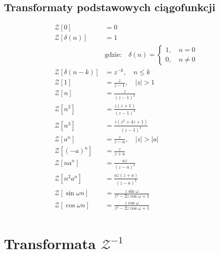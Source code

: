 \documentclass[a4paper,12pt]{article}
\begin{document}
\begin{multicols}{2}
\subsection*{Transformaty podstawowych ciągofunkcji}
    \begingroup
    \allowdisplaybreaks
    \begin{align*}
        \mathcal{Z}\left[0\right] &= 0 \\
        \mathcal{Z}\left[\delta\left(n\right)\right] &= 1\\
            &\text{gdzie:} \quad \delta\left(n\right) = \left\{
                \begin{array}{l}
                    1, \quad n = 0 \\
                    0, \quad n \not = 0
                \end{array}
            \right. \\
        \mathcal{Z}\left[\delta \left(n - k\right)\right] &= z^{-k}, \quad n \leq k \\
%
        \mathcal{Z}\left[1\right] &= \frac{z}{z - 1}, \quad \left| z \right| > 1 \\
        \mathcal{Z}\left[n\right] &= \frac{z}{\left(z - 1 \right)^2}\\
        \mathcal{Z}\left[n^2\right] &= \frac{z \left(z + 1\right)}{\left(z - 1 \right)^3}\\
        \mathcal{Z}\left[n^3\right] &= \frac{z \left(z^2 + 4z + 1\right)}{\left(z - 1 \right)^4}\\
%
        \mathcal{Z}\left[a^n\right] &= \frac{z}{z - a}, \quad \left| z \right| > \left| a \right| \\
        \mathcal{Z}\left[\left(-a\right)^n\right] &= \frac{z}{z + a} \\
        \mathcal{Z}\left[na^n\right] &= \frac{az}{\left(z - a\right)^2} \\
        \mathcal{Z}\left[n^2 a^n\right] &= \frac{az\left(z+a\right)}{\left(z - a\right)^3} \\
        \mathcal{Z}\left[\sin \omega n\right] &= \frac{z \sin \omega}{z^2 - 2z \cos \omega + 1} \\
        \mathcal{Z}\left[\cos \omega n\right] &= \frac{z \cos \omega}{z^2 - 2z \cos \omega + 1} \\
    \end{align*}
    \endgroup

\section{Transformata $\mathcal{Z}^{-1}$}


\end{multicols}
\end{document}

